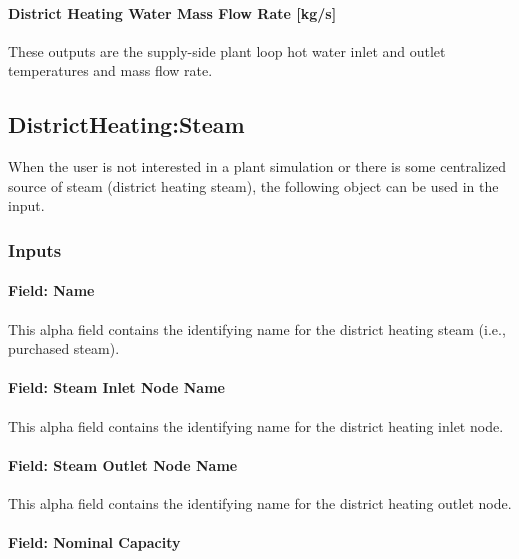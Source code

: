 \paragraph{District Heating Water Mass Flow Rate {[}kg/s{]}}\label{district-heating-mass-flow-rate-kgs}

These outputs are the supply-side plant loop hot water inlet and outlet temperatures and mass flow rate.

\subsection{DistrictHeating:Steam}\label{districtheatingsteam}

When the user is not interested in a plant simulation or there is some centralized source of steam (district heating steam), the following object can be used in the input.

\subsubsection{Inputs}\label{inputs-17-006-1}

\paragraph{Field: Name}\label{field-name-16-006-1}

This alpha field contains the identifying name for the district heating steam (i.e., purchased steam).

\paragraph{Field: Steam Inlet Node Name}\label{field-steam-inlet-node-name-2}

This alpha field contains the identifying name for the district heating inlet node.

\paragraph{Field: Steam Outlet Node Name}\label{field-steam-outlet-node-name-2}

This alpha field contains the identifying name for the district heating outlet node.

\paragraph{Field: Nominal Capacity}\label{field-nominal-capacity-12}

